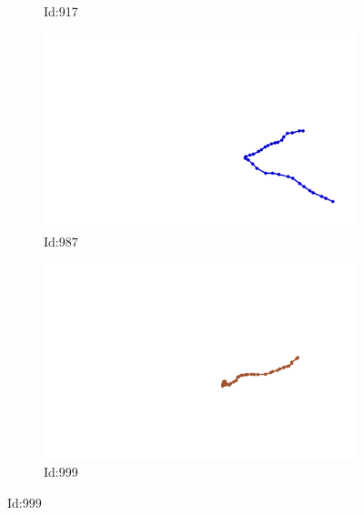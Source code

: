 \documentclass[12pt,twoside]{report}
\begin{document}
\begin{figure}
\begin{subfigure}[b]{0.20\textwidth}
\caption{Id:917}
\end{subfigure}
\begin{subfigure}[b]{0.20\textwidth}
\centering
\includegraphics[width=\textwidth]{../trajectories/987.png}
\caption{Id:987}
\end{subfigure}
\begin{subfigure}[b]{0.20\textwidth}
\centering
\includegraphics[width=\textwidth]{../trajectories/999.png}
\caption{Id:999}
\end{subfigure}
\end{figure}
\end{document}
